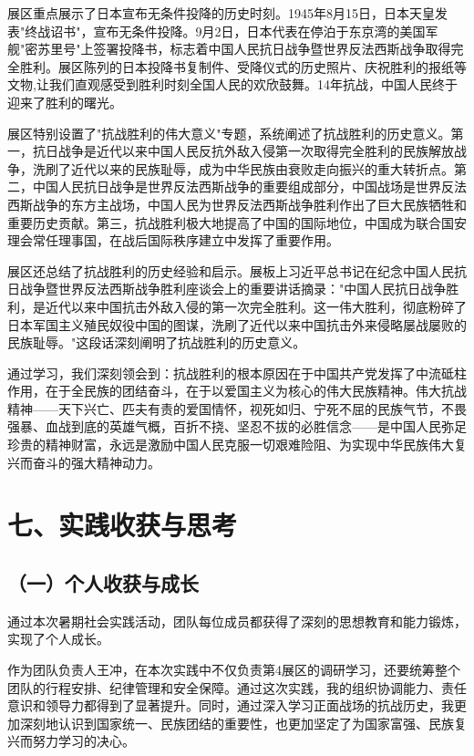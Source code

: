 \documentclass[a4paper,12pt]{article}
\begin{document}
展区重点展示了日本宣布无条件投降的历史时刻。1945年8月15日，日本天皇发表"终战诏书"，宣布无条件投降。9月2日，日本代表在停泊于东京湾的美国军舰"密苏里号"上签署投降书，标志着中国人民抗日战争暨世界反法西斯战争取得完全胜利。展区陈列的日本投降书复制件、受降仪式的历史照片、庆祝胜利的报纸等文物,让我们直观感受到胜利时刻全国人民的欢欣鼓舞。14年抗战，中国人民终于迎来了胜利的曙光。

展区特别设置了"抗战胜利的伟大意义"专题，系统阐述了抗战胜利的历史意义。第一，抗日战争是近代以来中国人民反抗外敌入侵第一次取得完全胜利的民族解放战争，洗刷了近代以来的民族耻辱，成为中华民族由衰败走向振兴的重大转折点。第二，中国人民抗日战争是世界反法西斯战争的重要组成部分，中国战场是世界反法西斯战争的东方主战场，中国人民为世界反法西斯战争胜利作出了巨大民族牺牲和重要历史贡献。第三，抗战胜利极大地提高了中国的国际地位，中国成为联合国安理会常任理事国，在战后国际秩序建立中发挥了重要作用。

展区还总结了抗战胜利的历史经验和启示。展板上习近平总书记在纪念中国人民抗日战争暨世界反法西斯战争胜利座谈会上的重要讲话摘录："中国人民抗日战争胜利，是近代以来中国抗击外敌入侵的第一次完全胜利。这一伟大胜利，彻底粉碎了日本军国主义殖民奴役中国的图谋，洗刷了近代以来中国抗击外来侵略屡战屡败的民族耻辱。"这段话深刻阐明了抗战胜利的历史意义。

通过学习，我们深刻领会到：抗战胜利的根本原因在于中国共产党发挥了中流砥柱作用，在于全民族的团结奋斗，在于以爱国主义为核心的伟大民族精神。伟大抗战精神——天下兴亡、匹夫有责的爱国情怀，视死如归、宁死不屈的民族气节，不畏强暴、血战到底的英雄气概，百折不挠、坚忍不拔的必胜信念——是中国人民弥足珍贵的精神财富，永远是激励中国人民克服一切艰难险阻、为实现中华民族伟大复兴而奋斗的强大精神动力。

\section*{\songti{}\textbf{七、实践收获与思考}}

\subsection*{\songti{}\textbf{（一）个人收获与成长}}

通过本次暑期社会实践活动，团队每位成员都获得了深刻的思想教育和能力锻炼，实现了个人成长。

作为团队负责人王冲，在本次实践中不仅负责第4展区的调研学习，还要统筹整个团队的行程安排、纪律管理和安全保障。通过这次实践，我的组织协调能力、责任意识和领导力都得到了显著提升。同时，通过深入学习正面战场的抗战历史，我更加深刻地认识到国家统一、民族团结的重要性，也更加坚定了为国家富强、民族复兴而努力学习的决心。
\end{document}
